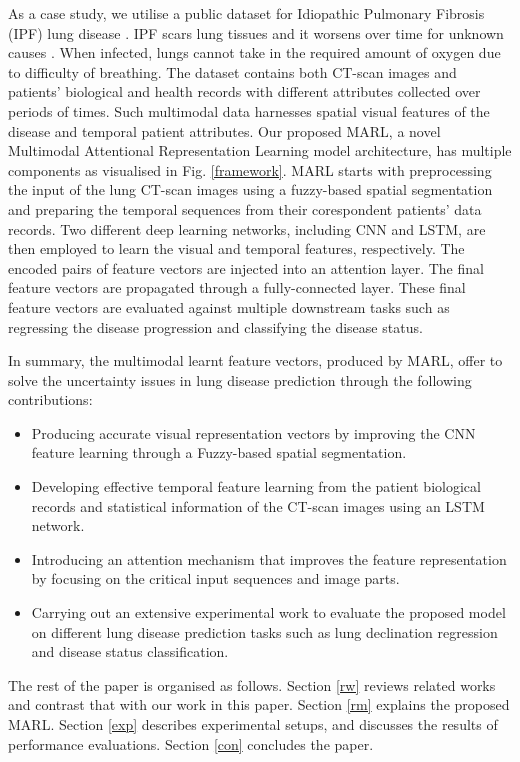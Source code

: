 \documentclass[conference]{IEEEtran}
\begin{document}
As a case study, we utilise a public dataset for Idiopathic Pulmonary Fibrosis (IPF) lung disease \cite{IPF_kaggle_2020}. IPF scars lung tissues and it worsens over time for unknown causes \cite{kafaja2018reliability}. When infected, lungs cannot take in the required amount of oxygen due to difficulty of breathing. The dataset contains both CT-scan images and patients' biological and health records with different attributes collected over periods of times. Such multimodal data harnesses spatial visual features of the disease and temporal patient attributes. Our proposed MARL, a novel Multimodal Attentional Representation Learning model architecture, has multiple components as visualised in Fig. \ref{framework}. MARL starts with preprocessing the input of the lung CT-scan images using a fuzzy-based spatial segmentation and preparing the temporal sequences from their corespondent patients' data records. Two different deep learning networks, including CNN and LSTM, are then employed to learn the visual and temporal features, respectively. The encoded pairs of feature vectors are injected into an attention layer. The final feature vectors are propagated through a fully-connected layer. These final feature vectors are evaluated against multiple downstream tasks such as regressing the disease progression and classifying the disease status.

In summary, the multimodal learnt feature vectors, produced by MARL, offer to solve the uncertainty issues in lung disease prediction through the following contributions:
\begin{itemize}
    \item Producing accurate visual representation vectors by improving the CNN feature learning through a Fuzzy-based spatial segmentation.
    \item Developing effective temporal feature learning from the patient biological records and statistical information of the CT-scan images using an LSTM network.
    \item Introducing an attention mechanism that improves the feature representation by focusing on the critical input sequences and image parts.
    \item Carrying out an extensive experimental work to evaluate the proposed model on different lung disease prediction tasks such as lung declination regression and disease status classification.
\end{itemize}

The rest of the paper is organised as follows. Section \ref{rw} reviews related works and contrast that with our work in this paper. Section \ref{rm} explains the proposed MARL. Section \ref{exp} describes experimental setups, and discusses the results of performance evaluations. Section \ref{con} concludes the paper. 
\end{document}
